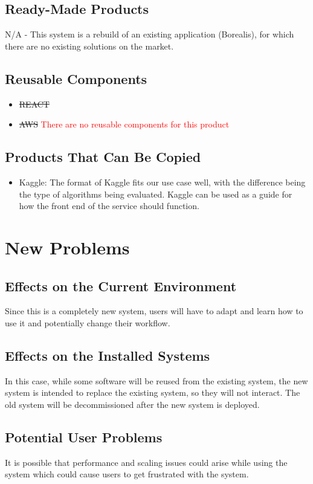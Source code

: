 \documentclass[12pt]{article}
\begin{document}
\subsection{Ready-Made Products}
N/A - This system is a rebuild of an existing application (Borealis), for which there are no existing solutions on the market.
\subsection{Reusable Components}
\begin{itemize}
    \item \sout{REACT}
    \item \sout{AWS}
    \textcolor{red}{There are no reusable components for this product}
\end{itemize}

\subsection{Products That Can Be Copied}
\begin{itemize}
    \item Kaggle: The format of Kaggle fits our use case well, with the difference being the type of algorithms being evaluated. Kaggle can be used as a guide for how the front end of the service should function.
\end{itemize}

\section{New Problems}
\subsection{Effects on the Current Environment}
Since this is a completely new system, users will have to adapt and learn how to use it and potentially change their workflow. 
\subsection{Effects on the Installed Systems}
In this case, while some software will be reused from the existing system, the new system is intended to replace the existing system, so they will not interact. The old system will be decommissioned after the new system is deployed.

\subsection{Potential User Problems}
It is possible that performance and scaling issues could arise while using the system which could cause users to get frustrated with the system. 
\end{document}
